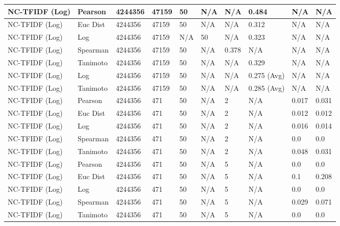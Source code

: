 \documentclass{article}
\begin{document}
\begin{longtable}{ |p{1.7cm}|p{1.9cm}|p{1.5cm}|p{1.5cm}|p{0.75cm}|p{0.75cm}|p{0.75cm}|p{0.75cm}|p{1.5cm}|p{1.5cm}|}
    NC-TFIDF (Log) & Pearson & 4244356 & 47159 & 50 & N/A & N/A & 0.484 & N/A & N/A  \\ \hline
    NC-TFIDF (Log) & Euc Dist & 4244356 & 47159 & 50 & N/A & N/A & 0.312 & N/A & N/A   \\ \hline
    NC-TFIDF (Log) & Log & 4244356 & 47159 & N/A &  50 & N/A& 0.323 & N/A & N/A  \\ \hline
    NC-TFIDF (Log) & Spearman & 4244356 & 47159 & 50 & N/A & 0.378 & N/A & N/A & N/A \\ \hline
    NC-TFIDF (Log) & Tanimoto & 4244356 & 47159 & 50 & N/A& N/A & 0.329 & N/A & N/A \\ \hline
    NC-TFIDF (Log) & Log & 4244356 & 47159 & 50 & N/A& N/A & 0.275 (Avg) & N/A & N/A \\ \hline
    NC-TFIDF (Log) & Tanimoto & 4244356 & 47159 & 50 & N/A & N/A & 0.285 (Avg) & N/A & N/A \\ \hline
    
    NC-TFIDF (Log)  & Pearson & 4244356 & 471 & 50 & N/A  & 2 & N/A & 0.017 & 0.031  \\ \hline
    NC-TFIDF (Log)  & Euc Dist & 4244356 & 471 & 50 & N/A  & 2 & N/A &0.012 & 0.012   \\ \hline
    NC-TFIDF (Log)  & Log & 4244356 & 471 & 50 & N/A & 2 & N/A & 0.016 & 0.014  \\ \hline
    NC-TFIDF (Log)  & Spearman & 4244356 & 471 & 50 & N/A  & 2 & N/A &0.0 & 0.0 \\ \hline
    NC-TFIDF (Log)  & Tanimoto & 4244356 & 471 & 50 & N/A  & 2 & N/A & 0.048 & 0.031 \\ \hline
    
    NC-TFIDF (Log)  & Pearson & 4244356 & 471 & 50 & N/A  & 5 & N/A & 0.0 & 0.0  \\ \hline
    NC-TFIDF (Log)  & Euc Dist & 4244356 & 471 & 50 & N/A  & 5 & N/A &0.1 & 0.208   \\ \hline
    NC-TFIDF (Log)  & Log & 4244356 & 471 & 50 & N/A & 5 & N/A & 0.0 & 0.0  \\ \hline
    NC-TFIDF (Log)  & Spearman & 4244356 & 471 & 50 & N/A  & 5 & N/A &0.029 & 0.071 \\ \hline
    NC-TFIDF (Log)  & Tanimoto & 4244356 & 471 & 50 & N/A  & 5 & N/A & 0.0 & 0.0 \\ \hline
    

\end{longtable}
\end{document}
